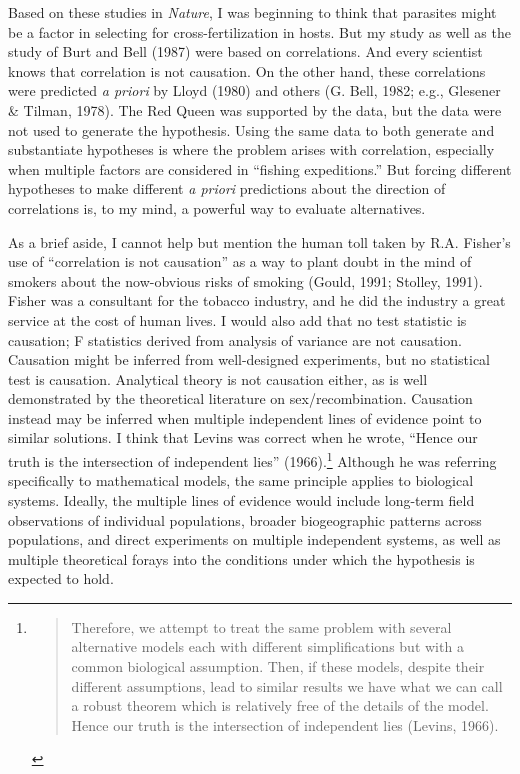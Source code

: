 \documentclass[
  letterpaper,
]{book}
\begin{document}
Based on these studies in \emph{Nature}, I was beginning to think that
parasites might be a factor in selecting for cross-fertilization in
hosts. But my study as well as the study of Burt and Bell (1987) were
based on correlations. And every scientist knows that correlation is not
causation. On the other hand, these correlations were predicted \emph{a
priori} by Lloyd (1980) and others (G. Bell, 1982; e.g., Glesener \&
Tilman, 1978). The Red Queen was supported by the data, but the data
were not used to generate the hypothesis. Using the same data to both
generate and substantiate hypotheses is where the problem arises with
correlation, especially when multiple factors are considered in
``fishing expeditions.'' But forcing different hypotheses to make
different \emph{a priori} predictions about the direction of
correlations is, to my mind, a powerful way to evaluate alternatives.

As a brief aside, I cannot help but mention the human toll taken by R.A.
Fisher's use of ``correlation is not causation'' as a way to plant doubt
in the mind of smokers about the now-obvious risks of smoking (Gould,
1991; Stolley, 1991). Fisher was a consultant for the tobacco industry,
and he did the industry a great service at the cost of human lives. I
would also add that no test statistic is causation; F statistics derived
from analysis of variance are not causation. Causation might be inferred
from well-designed experiments, but no statistical test is causation.
Analytical theory is not causation either, as is well demonstrated by
the theoretical literature on sex/recombination. Causation instead may
be inferred when multiple independent lines of evidence point to similar
solutions. I think that Levins was correct when he wrote, ``Hence our
truth is the intersection of independent lies'' (1966).\footnote{\begin{quote}
  Therefore, we attempt to treat the same problem with several
  alternative models each with different simplifications but with a
  common biological assumption. Then, if these models, despite their
  different assumptions, lead to similar results we have what we can
  call a robust theorem which is relatively free of the details of the
  model. Hence our truth is the intersection of independent lies
  (Levins, 1966).
  \end{quote}} Although he was referring specifically to mathematical
models, the same principle applies to biological systems. Ideally, the
multiple lines of evidence would include long-term field observations of
individual populations, broader biogeographic patterns across
populations, and direct experiments on multiple independent systems, as
well as multiple theoretical forays into the conditions under which the
hypothesis is expected to hold.
\end{document}
